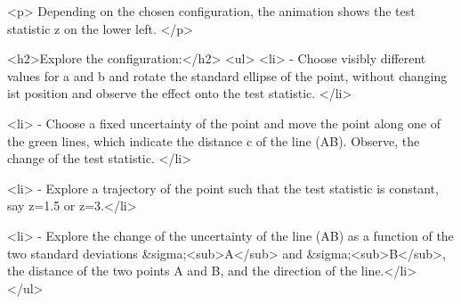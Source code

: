     
<p> Depending on the chosen configuration, the animation shows the test statistic z on the lower left. </p>
    

    <h2>Explore the configuration:</h2>
    <ul>
      <li> - Choose visibly different values for a and b and rotate the standard ellipse of the point, without changing ist position and observe the effect onto the test statistic. </li>
 			
 			<li> - Choose a fixed  uncertainty of the point and move the point along one of the green lines, which indicate the distance c of the line (AB). Observe, the change of the test statistic. </li>
 			
 			<li> - Explore a trajectory of the point such that the test statistic is constant, say z=1.5 or z=3.</li>
 			
	    <li> - Explore the change of the uncertainty of the line (AB) as a function of the two standard deviations &sigma;<sub>A</sub> and &sigma;<sub>B</sub>, the distance of the two points A and B, and the direction of the line.</li>
	        </ul>